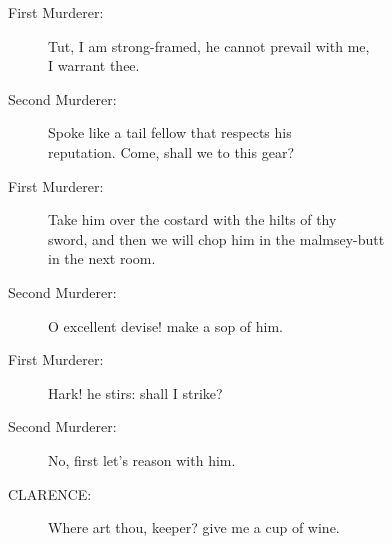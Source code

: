 \documentclass{article}
\begin{document}
\begin{description}
\item[First Murderer:] 
\hspace{1pt}Tut, I am strong-framed, he cannot prevail with me,\\
\hspace{1pt}I warrant thee.\\
\end{description}
\begin{description}
\item[Second Murderer:] 
\hspace{1pt}Spoke like a tail fellow that respects his\\
\hspace{1pt}reputation. Come, shall we to this gear?\\
\end{description}
\begin{description}
\item[First Murderer:] 
\hspace{1pt}Take him over the costard with the hilts of thy\\
\hspace{1pt}sword, and then we will chop him in the malmsey-butt\\
\hspace{1pt}in the next room.\\
\end{description}
\begin{description}
\item[Second Murderer:] 
\hspace{1pt}O excellent devise! make a sop of him.\\
\end{description}
\begin{description}
\item[First Murderer:] 
\hspace{1pt}Hark! he stirs: shall I strike?\\
\end{description}
\begin{description}
\item[Second Murderer:] 
\hspace{1pt}No, first let's reason with him.\\
\end{description}
\begin{description}
\item[CLARENCE:] 
\hspace{1pt}Where art thou, keeper? give me a cup of wine.\\
\end{description}
\end{document}

